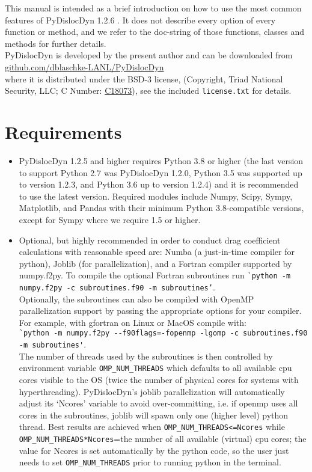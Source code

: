\documentclass[11pt,letterpaper,oneside,pdftex]{article}
\begin{document}
\noindent
This manual is intended as a brief introduction on how to use the most common features of PyDislocDyn 1.2.6 \cite{pydislocdyn}.
It does not describe every option of every function or method, and we refer to the doc-string of those functions, classes and methods for further details.
\\
PyDislocDyn is developed by the present author and can be downloaded from
\\\href{https://github.com/dblaschke-LANL/PyDislocDyn}{github.com/dblaschke-LANL/PyDislocDyn}\\
where it is distributed under the BSD-3 license, (Copyright, Triad National Security, LLC; C Number: \href{https://doi.org/10.11578/dc.20180619.15}{C18073}), see the included \verb|license.txt| for details.


\section{Requirements}
\begin{itemize}
\item PyDislocDyn 1.2.5 and higher requires Python 3.8 or higher (the last version to support Python 2.7 was PyDislocDyn 1.2.0, Python 3.5 was supported up to version 1.2.3, and Python 3.6 up to version 1.2.4) and it is recommended to use the latest version.
Required modules include Numpy, Scipy, Sympy, Matplotlib, and Pandas with their minimum Python 3.8-compatible versions, except for Sympy where we require 1.5 or higher.
\item Optional, but highly recommended in order to conduct drag coefficient calculations with reasonable speed are:
Numba (a just-in-time compiler for python), Joblib (for parallelization), and a Fortran compiler supported by numpy.f2py. To compile the optional Fortran subroutines run \verb|`python -m numpy.f2py -c subroutines.f90 -m subroutines’|.\\
Optionally, the subroutines can also be compiled with OpenMP parallelization support by passing the appropriate options for your compiler. For example, with gfortran on Linux or MacOS compile with:
\\\verb|`python -m numpy.f2py --f90flags=-fopenmp -lgomp -c subroutines.f90|\\\verb|-m subroutines'|.\\
The number of threads used by the subroutines is then controlled by environment variable \verb|OMP_NUM_THREADS| which defaults to all available cpu cores visible to the OS (twice the number of physical cores for systems with hyperthreading). PyDislocDyn’s joblib parallelization will automatically adjust its ‘Ncores’ variable to avoid over-committing, i.e. if openmp uses all cores in the subroutines, joblib will spawn only one (higher level) python thread. Best results are achieved when \verb|OMP_NUM_THREADS<=Ncores| while \verb|OMP_NUM_THREADS*Ncores|=the number of all available (virtual) cpu cores; the value for Ncores is set automatically by the python code, so the user just needs to set \verb|OMP_NUM_THREADS| prior to running python in the terminal.
\end{itemize}
\end{document}
